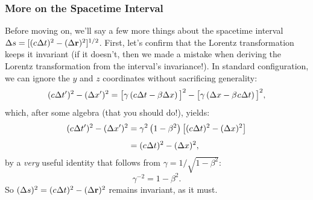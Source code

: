 \documentclass[12pt]{article}
\renewcommand{\vv}[1]{\mathbf{#1}}
\begin{document}
\subsubsection{More on the Spacetime Interval}\label{sssec:sti2}
Before moving on, we'll say a few more things about the spacetime interval $\Delta s = [(c \mkern.5mu \Delta t)^2 - ( \Delta \vv r )^2]^{1/2}$. First, let's confirm that the Lorentz transformation keeps it invariant (if it doesn't, then we made a mistake when deriving the Lorentz transformation from the interval's invariance!). In standard configuration, we can ignore the $y$ and $z$ coordinates without sacrificing generality:
\begin{equation*}
(c \mkern.5mu \Delta t^{\prime})^2 - (\Delta x^{\prime})^2 = \big[ \gamma \left( c \mkern.5mu \Delta t - \beta \Delta x \right) \big] ^2 - \big[ \gamma \left( \Delta x - \beta \mkern1mu c \mkern.5mu \Delta t \right) \big]^2 ,
\end{equation*}
which, after some algebra (that you should do!), yields:
\begin{equation*}
\begin{aligned}
(c \mkern.5mu \Delta t^{\prime})^2 - (\Delta x^{\prime})^2 &= \gamma^2 \left( 1 - \beta^2 \right) \left[ (c \mkern.5mu \Delta t)^2 - ( \Delta x )^2 \right] \\[4pt]
&= (c \mkern.5mu \Delta t)^2 - ( \Delta x )^2 ,
\end{aligned}
\end{equation*}
by a \emph{very} useful identity that follows from $\gamma = 1/\sqrt{1 - \beta^2}$:
\begin{equation}\label{eq:20}
\gamma^{-2} = 1 - \beta^2 .
\end{equation}
So $(\Delta s)^2 = (c \mkern.5mu \Delta t)^2 - ( \Delta \vv r )^2$ remains invariant, as it must.
\end{document}
